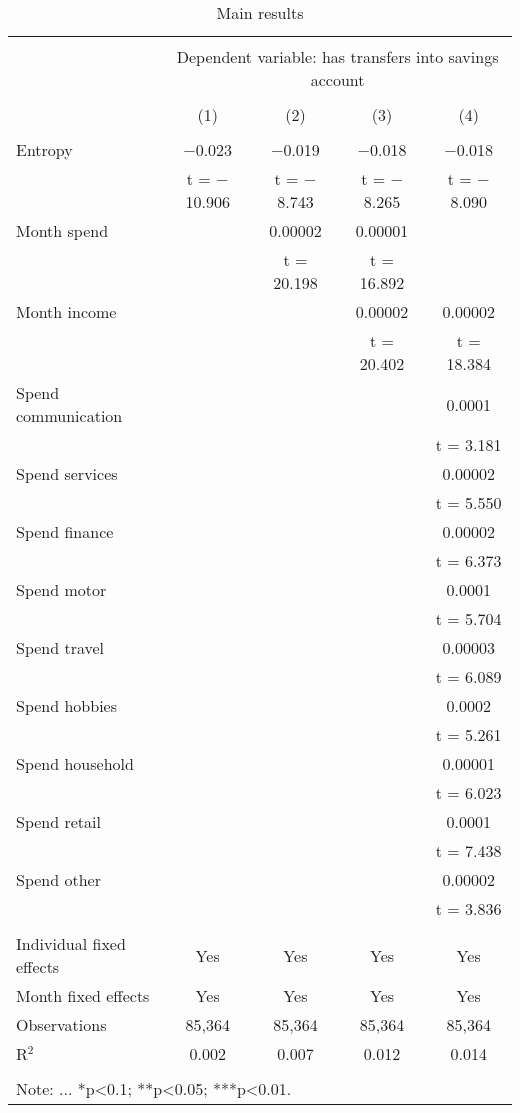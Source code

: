 
\begin{table}[!htbp] \centering 
  \caption{Main results} 
  \label{tab:main_results} 
\begin{tabular}{@{\extracolsep{5pt}}lcccc} 
\\[-1.8ex]\hline 
\hline \\[-1.8ex] 
 & \multicolumn{4}{c}{Dependent variable: has transfers into savings account} \\ 
\cline{2-5} 
\\[-1.8ex] & (1) & (2) & (3) & (4)\\ 
\hline \\[-1.8ex] 
 Entropy & $-$0.023 & $-$0.019 & $-$0.018 & $-$0.018 \\ 
  & t = $-$10.906 & t = $-$8.743 & t = $-$8.265 & t = $-$8.090 \\ 
  Month spend &  & 0.00002 & 0.00001 &  \\ 
  &  & t = 20.198 & t = 16.892 &  \\ 
  Month income &  &  & 0.00002 & 0.00002 \\ 
  &  &  & t = 20.402 & t = 18.384 \\ 
  Spend communication &  &  &  & 0.0001 \\ 
  &  &  &  & t = 3.181 \\ 
  Spend services &  &  &  & 0.00002 \\ 
  &  &  &  & t = 5.550 \\ 
  Spend finance &  &  &  & 0.00002 \\ 
  &  &  &  & t = 6.373 \\ 
  Spend motor &  &  &  & 0.0001 \\ 
  &  &  &  & t = 5.704 \\ 
  Spend travel &  &  &  & 0.00003 \\ 
  &  &  &  & t = 6.089 \\ 
  Spend hobbies &  &  &  & 0.0002 \\ 
  &  &  &  & t = 5.261 \\ 
  Spend household &  &  &  & 0.00001 \\ 
  &  &  &  & t = 6.023 \\ 
  Spend retail &  &  &  & 0.0001 \\ 
  &  &  &  & t = 7.438 \\ 
  Spend other &  &  &  & 0.00002 \\ 
  &  &  &  & t = 3.836 \\ 
 \hline \\[-1.8ex] 
Individual fixed effects & Yes & Yes & Yes & Yes \\ 
Month fixed effects & Yes & Yes & Yes & Yes \\ 
Observations & 85,364 & 85,364 & 85,364 & 85,364 \\ 
R$^{2}$ & 0.002 & 0.007 & 0.012 & 0.014 \\ 
\hline 
\hline \\[-1.8ex] 
\multicolumn{5}{l}{Note: ... *p<0.1; **p<0.05; ***p<0.01.} \\ 
\end{tabular} 
\end{table} 
